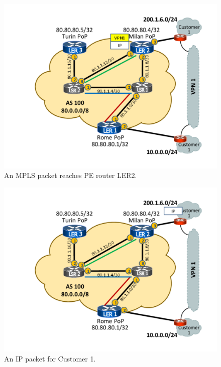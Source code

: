 \documentclass{article}
\begin{document}
\begin{figure}
\centering
 \includegraphics[trim=0cm 1.5cm 0cm 1.5cm, clip=true, width=0.7\columnwidth]{figures/mpls-slides-23}
 \caption{An MPLS packet reaches PE router LER2.}
 \label{fig:mpls-slides-23}
\end{figure}

\begin{figure}
\centering
 \includegraphics[trim=0cm 1.5cm 0cm 1.5cm, clip=true, width=0.7\columnwidth]{figures/mpls-slides-24}
 \caption{An IP packet for Customer 1.}
 \label{fig:mpls-slides-24}
\end{figure}
\end{document}
